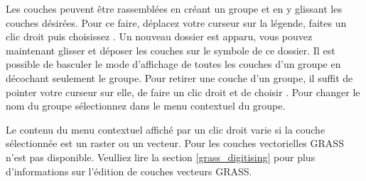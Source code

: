 Les couches peuvent \^etre rassembl\'ees en cr\'eant un groupe et en y glissant les couches d\'esir\'ees. Pour ce faire, d\'eplacez votre curseur sur la l\'egende, faites un clic droit puis choisissez . Un nouveau dossier est apparu, vous pouvez maintenant glisser et d\'eposer les couches sur le symbole de ce dossier. Il est possible de basculer le mode d'affichage de toutes les couches d'un groupe en d\'ecochant seulement le groupe. Pour retirer une couche d'un groupe, il suffit de pointer votre curseur sur elle, de faire un clic droit et de choisir . Pour changer le nom du groupe s\'electionnez  dans le menu contextuel du groupe.

Le contenu du menu contextuel affich\'e par un clic droit varie si la couche s\'electionn\'ee est un raster ou un vecteur. Pour les couches vectorielles GRASS  n'est pas disponible. Veulliez lire la section \ref{grass_digitising} pour plus d'informations sur l'\'edition de couches vecteurs GRASS.

%

